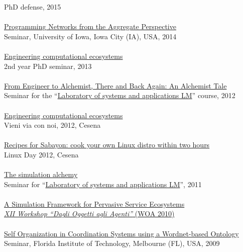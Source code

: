 \documentclass[10pt]{article}
\newcommand{\halfblankline}{\quad\vspace{-0.5\baselineskip}\pagebreak[3]}
\begin{document}
PhD defense, 2015
\\ \halfblankline \\
\href{}{Programming Networks from the Aggregate Perspective} \\
Seminar, University of Iowa, Iowa City (IA), USA, 2014
\\ \halfblankline \\
\href{https://www.slideshare.net/DanySK/engineering-computational-ecosystems-2nd-year-ph-d-seminar}{Engineering computational ecosystems} \\
2nd year PhD seminar, 2013
\\ \halfblankline \\
\href{http://campus.unibo.it/115195/}{From Engineer to Alchemist, There and Back Again: An Alchemist Tale} \\
Seminar for the ``\href{http://apice.unibo.it/xwiki/bin/view/Courses/LsaLm1213}{Laboratory of systems and applications LM}'' course, 2012
\\ \halfblankline \\
\href{https://www.slideshare.net/DanySK/engineering-computational-ecosystems}{Engineering computational ecosystems} \\
Vieni via con noi, 2012, Cesena
\\ \halfblankline \\
\href{https://www.slideshare.net/DanySK/recipes-for-sabayon-cook-your-own-linux-distro-within-two-hours}{Recipes for Sabayon: cook your own Linux distro within two hours} \\
Linux Day 2012, Cesena
\\ \halfblankline \\
\href{http://campus.unibo.it/83921/}{The simulation alchemy} \\
Seminar for ``\href{http://apice.unibo.it/xwiki/bin/view/Courses/LsaLm1112}{Laboratory of systems and applications LM}'', 2011
\\ \halfblankline \\
\href{http://apice.unibo.it/xwiki/bin/view/Talks/PianiniWoa2011}{A Simulation Framework for Pervasive Service Ecosystems} \\
\href{http://www.inf.u-szeged.hu/projectdirs/saso10/}{\textit{XII Workshop ``Dagli Oggetti agli Agenti''} (WOA 2010)}
\\ \halfblankline \\
\href{}{Self Organization in Coordination Systems using a Wordnet-based Ontology} \\
Seminar, Florida Institute of Technology, Melbourne (FL), USA, 2009
\end{document}

